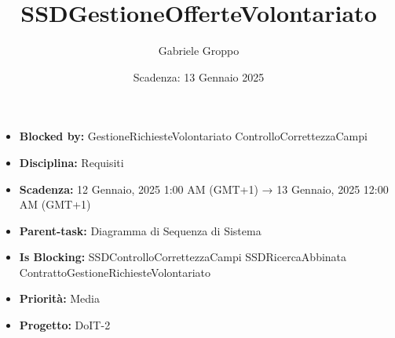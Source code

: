 \title{SSDGestioneOfferteVolontariato}
\author{Gabriele Groppo}
\date{Scadenza: 13 Gennaio 2025}

\maketitle

\begin{itemize}
    \item \textbf{Blocked by:} GestioneRichiesteVolontariato ControlloCorrettezzaCampi
    \item \textbf{Disciplina:} Requisiti
    \item \textbf{Scadenza:} 12 Gennaio, 2025 1:00 AM (GMT+1) → 13 Gennaio, 2025 12:00 AM (GMT+1)
    \item \textbf{Parent-task:} Diagramma di Sequenza di Sistema
    \item \textbf{Is Blocking:} SSDControlloCorrettezzaCampi SSDRicercaAbbinata ContrattoGestioneRichiesteVolontariato
    \item \textbf{Priorità:} Media 
    \item \textbf{Progetto:} DoIT-2
\end{itemize}